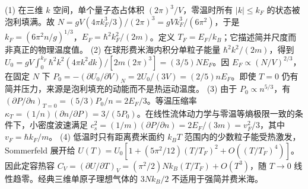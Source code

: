 (1) 在三维 \(k\) 空间，单个量子态占体积 \((2\pi)^3/V\)，零温时所有 \(|k|\le k_F\) 的状态被泡利填满。故 \(N=gV(4\pi k_F^3/3)/(2\pi)^3=gVk_F^3/(6\pi^2)\)，于是 \(k_F=(6\pi^2n/g)^{1/3}\)，\(E_F=\hbar^2k_F^2/(2m)\)。定义 \(T_F=E_F/k_B\)；它描述简并尺度而非真正的物理温度值。
(2) 在球形费米海内积分单粒子能量 \(\hbar^2k^2/(2m)\)，得到 \(U_0=gV\int_0^{k_F}\hbar^2k^2(4\pi k^2dk)/[2m(2\pi)^3]=(3/5)NE_F\)。因 \(E_F\propto(N/V)^{2/3}\)，在固定 \(N\) 下 \(P_0=-(\partial U_0/\partial V)_N=2U_0/(3V)=(2/5)nE_F\)。即使 \(T=0\) 仍有简并压力，来源是泡利填充的动能而不是热运动温度。
(3) 由于 \(P_0\propto n^{5/3}\)，有 \((\partial P/\partial n)_{T=0}=(5/3)P_0/n=2E_F/3\)。等温压缩率 \(\kappa_T=(1/n)(\partial n/\partial P)=3/(5P_0)\)。在线性流体动力学与零温等熵极限一致的条件下，小密度波速满足 \(c_s^2=(1/m)(\partial P/\partial n)=2E_F/(3m)=v_F^2/3\)，其中 \(v_F=\hbar k_F/m\)。
(4) 低温时只有距离费米面约 \(k_BT\) 范围内的少数粒子能受热激发，Sommerfeld 展开给 \(U(T)=U_0[1+(5\pi^2/12)(T/T_F)^2+O((T/T_F)^4)]\)。因此定容热容 \(C_V=(\partial U/\partial T)_V=(\pi^2/2)Nk_B(T/T_F)+O(T^3)\)，随 \(T\to0\) 线性趋零。经典三维单原子理想气体的 \(3Nk_B/2\) 不适用于强简并费米海。
